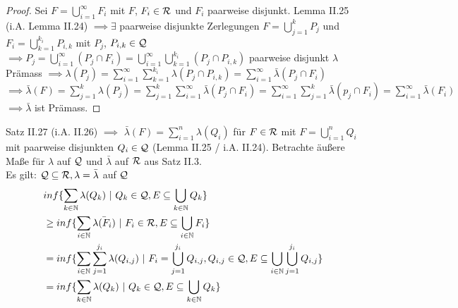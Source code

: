   \begin{proof}
    Sei $F = \bigcup\limits_{i=1}^{\infty}F_i$ mit $F$, $F_i\in\mathcal{R}$ und $F_i$ paarweise disjunkt. \newline
    Lemma II.25 (i.A. Lemma II.24) $\implies \exists$ paarweise disjunkte Zerlegungen $F = \bigcup\limits_{j=1}^{k}P_j$ und $F_i = \bigcup\limits_{k=1}^{k_i}P_{i,k}$ mit $P_j$, $P_{i,k}\in\mathcal{Q}$ \newline
    $\implies P_j = \bigcup\limits_{i=1}^{\infty}(P_j \cap F_i) = \bigcup\limits_{i=1}^{\infty}\bigcup\limits_{k=1}^{k_i}(P_j \cap P_{i,k})$ paarweise disjunkt \newline
    $\lambda$ Prämass $\implies \lambda(P_j) = \sum\limits_{i=1}^{\infty}\sum\limits_{k=1}^{k_i}\lambda(P_j\cap P_{i,k}) = \sum\limits_{i=1}^{\infty}\bar{\lambda}(P_j\cap F_i)$ \newline
    $\implies \bar{\lambda}(F) = \sum\limits_{j=1}^{k}\lambda(P_j) = \sum\limits_{j=1}^{k}\sum\limits_{i=1}^{\infty}\bar{\lambda}(P_j\cap F_i) = \sum\limits_{i=1}^{\infty}\sum\limits_{j=1}^{k}\bar{\lambda}(p_j\cap F_i) = \sum\limits_{i=1}^{\infty}\bar{\lambda}(F_i)$ \newline
    $\implies \bar{\lambda}$ ist Prämass.
  \end{proof}

  
  \begin{remark}
    Satz II.27 (i.A. II.26) $\implies$ $\bar{\lambda}(F) = \sum\limits_{i=1}^n \lambda(Q_i)$ für $F \in \mathcal{R}$ mit $F=\bigcup\limits_{i=1}^n Q_i$ mit paarweise disjunkten $Q_i \in \mathcal{Q}$ (Lemma II.25 / i.A. II.24). Betrachte äußere Maße für $\lambda$ auf $\mathcal{Q}$ und $\bar{\lambda}$ auf $\mathcal{R}$ aus Satz II.3.\\
    Es gilt: $\mathcal{Q} \subseteq \mathcal{R}, \lambda = \bar{\lambda}$ auf $\mathcal{Q}$
    \begin{align*}
      & inf\{\sum\limits_{k \in \mathbb{N}} \lambda(Q_k) \ | \ Q_k \in \script{Q}, E \subseteq \bigcup\limits_{k \in \mathbb{N}} Q_k\}\\
      &\geq inf\{\sum\limits_{i \in \mathbb{N}} \bar{\lambda(F_i)} \ | \ F_i \in \script{R}, E \subseteq \bigcup\limits_{i \in \mathbb{N}} F_i\}\\
      &= inf\{ \sum\limits_{i \in \mathbb{N}} \sum\limits_{j=1}^{j_i} \lambda(Q_{i,j}) \ | \ F_i = \bigcup\limits_{j=1}^{j_i} Q_{i,j}, Q_{i,j} \in \script{Q}, E \subseteq \bigcup\limits_{i \in \mathbb{N}} \bigcup\limits_{j=1}^{j_i} Q_{i,j}\}\\
      &= inf\{\sum\limits_{k \in \mathbb{N}} \lambda(Q_k) \ | \ Q_k \in \script{Q}, E \subseteq \bigcup\limits_{k \in \mathbb{N}} Q_k\}
    \end{align*}
  \end{remark}

